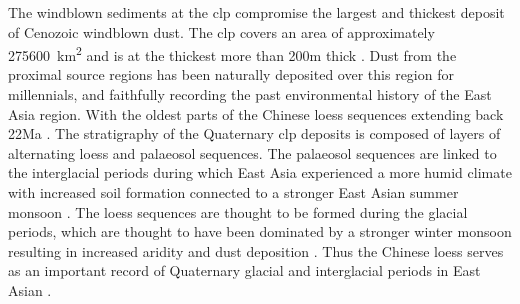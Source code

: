 \thispagestyle{plain}
The windblown sediments at the \acrfull{clp} compromise the largest and thickest deposit of Cenozoic windblown dust. The \acrshort{clp} covers an area of approximately \SI{275600}{\kilo\metre\squared} and is at the thickest more than 200\si{\metre} thick .
Dust from the proximal source regions has been naturally deposited over this region for millennials, and faithfully recording the past environmental history of the East Asia region. With the oldest parts of the Chinese loess sequences extending back 22Ma \parencite{qiang2011new}. The stratigraphy of the Quaternary \acrshort{clp} deposits is composed of layers of alternating loess and palaeosol sequences. The palaeosol sequences are linked to the interglacial periods during which East Asia experienced a more humid climate with increased soil formation connected to a stronger East Asian summer monsoon . The loess sequences are thought to be formed during the glacial periods, which are thought to have been dominated by a stronger winter monsoon resulting in increased aridity and dust deposition . Thus the Chinese loess serves as an important record of Quaternary glacial and interglacial periods in East Asian .

